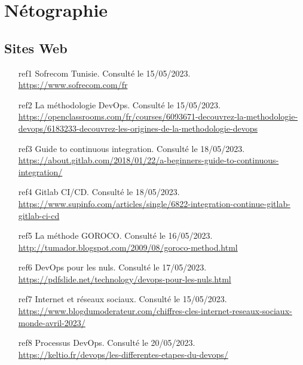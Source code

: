 \chapter*{\centering Nétographie}
\bigskip

\section*{Sites Web}

\begin{enumerate}
\item[ref1] Sofrecom Tunisie. Consulté le 15/05/2023.\\
\url{https://www.sofrecom.com/fr}

\item[ref2] La méthodologie DevOps. Consulté le 15/05/2023.\\
\url{https://openclassrooms.com/fr/courses/6093671-decouvrez-la-methodologie-devops/6183233-decouvrez-les-origines-de-la-methodologie-devops}

\item[ref3] Guide to continuous integration. Consulté le 18/05/2023.\\
\url{https://about.gitlab.com/2018/01/22/a-beginners-guide-to-continuous-integration/}

\item[ref4] Gitlab CI/CD. Consulté le 18/05/2023.\\
\url{https://www.supinfo.com/articles/single/6822-integration-continue-gitlab-gitlab-ci-cd}

\item[ref5] La méthode GOROCO. Consulté le 16/05/2023.\\
\url{http://tumador.blogspot.com/2009/08/goroco-method.html}

\item[ref6] DevOps pour les nuls. Consulté le 17/05/2023.\\
\url{https://pdfslide.net/technology/devops-pour-les-nuls.html}

\item[ref7] Internet et réseaux sociaux. Consulté le 15/05/2023.\\
\url{https://www.blogdumoderateur.com/chiffres-cles-internet-reseaux-sociaux-monde-avril-2023/}

\item[ref8] Processus DevOps. Consulté le 20/05/2023.\\
\url{https://keltio.fr/devops/les-differentes-etapes-du-devops/}


\end{enumerate}

